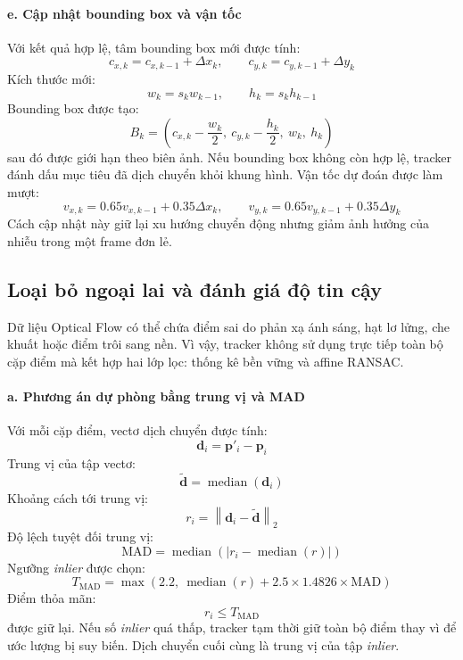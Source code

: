 \documentclass[../DoAn.tex]{subfiles}
\begin{document}
\paragraph{e. Cập nhật bounding box và vận tốc}
Với kết quả hợp lệ, tâm bounding box mới được tính:
\[
c_{x,k} = c_{x,k-1} + \Delta x_k, \qquad c_{y,k} = c_{y,k-1} + \Delta y_k
\]
Kích thước mới:
\[
w_k = s_k w_{k-1}, \qquad h_k = s_k h_{k-1}
\]
Bounding box được tạo:
\[
B_k = \left(c_{x,k} - \frac{w_k}{2},\ c_{y,k} - \frac{h_k}{2},\ w_k,\ h_k\right)
\]
sau đó được giới hạn theo biên ảnh. Nếu bounding box không còn hợp lệ, tracker đánh dấu mục tiêu đã dịch chuyển khỏi khung hình. Vận tốc dự đoán được làm mượt:
\[
v_{x,k} = 0.65 v_{x,k-1} + 0.35 \Delta x_k, \qquad v_{y,k} = 0.65 v_{y,k-1} + 0.35 \Delta y_k
\]
Cách cập nhật này giữ lại xu hướng chuyển động nhưng giảm ảnh hưởng của nhiễu trong một frame đơn lẻ.

\subsection{Loại bỏ ngoại lai và đánh giá độ tin cậy}

Dữ liệu Optical Flow có thể chứa điểm sai do phản xạ ánh sáng, hạt lơ lửng, che khuất hoặc điểm trôi sang nền. Vì vậy, tracker không sử dụng trực tiếp toàn bộ cặp điểm mà kết hợp hai lớp lọc: thống kê bền vững và affine RANSAC.

\paragraph{a. Phương án dự phòng bằng trung vị và MAD}
Với mỗi cặp điểm, vectơ dịch chuyển được tính:
\[
\mathbf{d}_i = \mathbf{p}'_i - \mathbf{p}_i
\]
Trung vị của tập vectơ:
\[
\widetilde{\mathbf{d}} = \operatorname{median}(\mathbf{d}_i)
\]
Khoảng cách tới trung vị:
\[
r_i = \left\|\mathbf{d}_i - \widetilde{\mathbf{d}}\right\|_2
\]
Độ lệch tuyệt đối trung vị:
\[
\mathrm{MAD} = \operatorname{median}\left(\left|r_i - \operatorname{median}(r)\right|\right)
\]
Ngưỡng \textit{inlier} được chọn:
\[
T_{\mathrm{MAD}} = \max\left(2.2,\ \operatorname{median}(r) + 2.5 \times 1.4826 \times \mathrm{MAD}\right)
\]
Điểm thỏa mãn:
\[
r_i \leq T_{\mathrm{MAD}}
\]
được giữ lại. Nếu số \textit{inlier} quá thấp, tracker tạm thời giữ toàn bộ điểm thay vì để ước lượng bị suy biến. Dịch chuyển cuối cùng là trung vị của tập \textit{inlier}.
\end{document}

